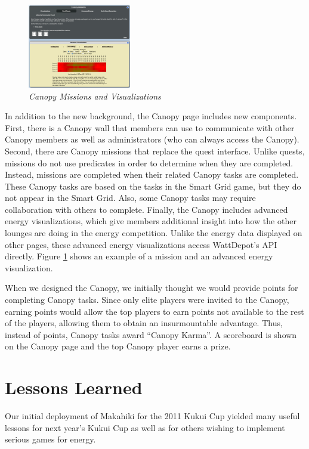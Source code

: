 \documentclass{acm_proc_article-sp}
\begin{document}
\begin{figure}[ht!]
  \center
  \includegraphics[width=0.4\textwidth]{canopy-missions-visualizations.eps}
  \caption{\em \small Canopy Missions and Visualizations}
  \label{fig:CanopyMissions}
\end{figure}

In addition to the new background, the Canopy page includes new components. First, there is a Canopy wall that members can use to communicate with other Canopy members as well as administrators (who can always access the Canopy). Second, there are Canopy missions that replace the quest interface. Unlike quests, missions do not use predicates in order to determine when they are completed. Instead, missions are completed when their related Canopy tasks are completed. These Canopy tasks are based on the tasks in the Smart Grid game, but they do not appear in the Smart Grid. Also, some Canopy tasks may require collaboration with others to complete. Finally, the Canopy includes advanced energy visualizations, which give members additional insight into how the other lounges are doing in the energy competition. Unlike the energy data displayed on other pages, these advanced energy visualizations access WattDepot's API directly. Figure \ref{fig:CanopyMissions} shows an example of a mission and an advanced energy visualization.

When we designed the Canopy, we initially thought we would provide points for completing Canopy tasks. Since only elite players were invited to the Canopy, earning points would allow the top players to earn points not available to the rest of the players, allowing them to obtain an insurmountable advantage. Thus, instead of points, Canopy tasks award ``Canopy Karma''. A scoreboard is shown on the Canopy page and the top Canopy player earns a prize.

\section{Lessons Learned}

Our initial deployment of Makahiki for the 2011 Kukui Cup yielded many
useful lessons for next year's Kukui Cup as well as for others wishing to
implement serious games for energy. 
\end{document}
